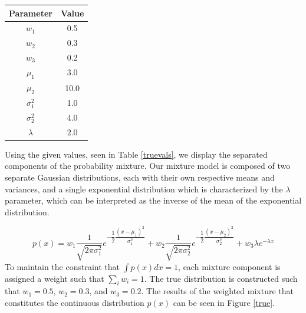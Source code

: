 \documentclass[12pt]{article}
\begin{document}
\begin{center}
	\begin{tabular}[5pt]{| c| c|}
	\hline
    Parameter	& Value \\[0.5ex] 
	\hline 
	
	$w_1$& 0.5  \\ \hline 
	$w_2$& 0.3  \\ \hline 
	$w_3$& 0.2  \\ \hline 
	$\mu_1$& 3.0  \\ \hline 
	$\mu_2$& 10.0  \\ \hline 
	$\sigma_1^2$& 1.0  \\ \hline 
	$\sigma_2^2$& 4.0  \\ \hline 
	$\lambda$& 2.0  \\ \hline 
\end{tabular}
\label{truevals}
\end{center}
 Using the given values, seen in Table \ref{truevals}, we display the separated components of the probability mixture. Our mixture model is composed of two separate Gaussian distributions, each with their own respective means and variances, and a single exponential distribution which is characterized by the $\lambda$ parameter, which can be interpreted as the inverse of the mean of the exponential distribution.


\begin{equation}\label{PDF}
p(x) = w_1 \dfrac{1}{\sqrt{2\pi\sigma_{1}^{2}}}e^{-\dfrac{1}{2}\dfrac{(x-\mu_1)^2}{\sigma_{1}^{2}}}+w_2 \dfrac{1}{\sqrt{2\pi\sigma_{2}^{2}}}e^{-\dfrac{1}{2}\dfrac{(x-\mu_2)^2}{\sigma_{2}^{2}}}+w_3\lambda e^{-\lambda x}
\end{equation}
To maintain the constraint that $\int p(x) dx=1$, each mixture component is assigned a weight such that $\sum_{i} w_i = 1$. The true distribution is constructed such that $w_1 = 0.5$, $w_2 = 0.3$, and $w_3 = 0.2$. The results of the weighted mixture that constitutes the continuous distribution $p(x)$ can be seen in Figure \ref{true}.
\end{document}
